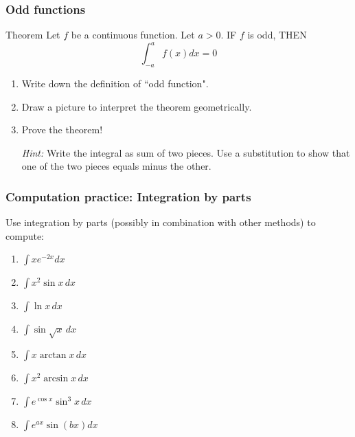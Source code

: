 \documentclass[14pt]{beamer}
\begin{document}
\begin{frame}[t]
	\fontsize{13}{13}\selectfont
	\frametitle{Odd functions}

	\begin{block}{Theorem}
		Let $f$ be a continuous function. Let $a >0$. IF $f$ is odd, THEN
		\[
			\int_{-a}^{a}f(x) dx = 0
		\]
	\end{block}


	\begin{enumerate}
		\item Write down the definition of ``odd function".

		\item Draw a picture to interpret the theorem geometrically.

		\item Prove the theorem!

			\emph{Hint:} Write the integral as sum of two pieces. Use a substitution to
			show that one of the two pieces equals minus the other.
	\end{enumerate}
\end{frame}

\begin{frame}[t]
	\frametitle{Computation practice: Integration by parts}

	Use integration by parts (possibly in combination with other methods) to
	compute:
	\begin{multicols}{2}
		\begin{enumerate}
			\item $\displaystyle \int x e^{-2x}dx$
				\vspace{.2cm}

			\item $\displaystyle \int x^{2}\sin x \, dx$
				\vspace{.2cm}

			\item $\displaystyle \int \ln x \, dx$
				\vspace{.2cm}

			\item $\displaystyle \int \sin \sqrt{x}\, dx$
				\vspace{.2cm}

			\item $\displaystyle \int x \arctan x \, dx$
				\vspace{.2cm}

			\item $\displaystyle \int x^{2}\arcsin x \, dx$
				\vspace{.2cm}

			\item $\displaystyle \int e^{\cos x}\sin^{3}x \, dx$
				\vspace{.2cm}

			\item $\displaystyle \int e^{ax}\sin (bx) dx$
				\vspace{.2cm}
		\end{enumerate}
	\end{multicols}
\end{frame}
\end{document}
